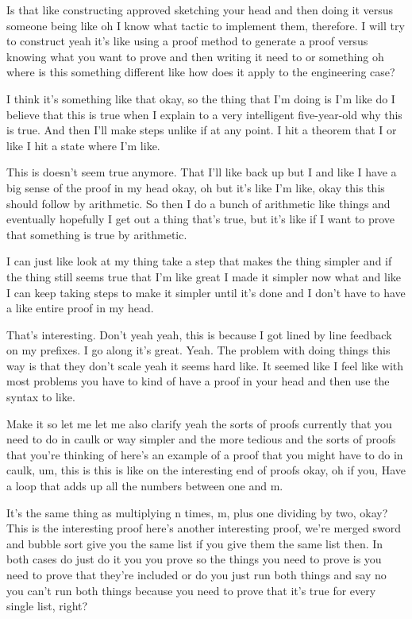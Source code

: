 Is that like constructing approved sketching your head and then doing it versus someone being like oh I know what tactic to implement them, therefore. I will try to construct yeah it's like using a proof method to generate a proof versus knowing what you want to prove and then writing it need to or something oh where is this something different like how does it apply to the engineering case? 

I think it's something like that okay, so the thing that I'm doing is I'm like do I believe that this is true when I explain to a very intelligent five-year-old why this is true. And then I'll make steps unlike if at any point. I hit a theorem that I or like I hit a state where I'm like. 

This is doesn't seem true anymore. That I'll like back up but I and like I have a big sense of the proof in my head okay, oh but it's like I'm like, okay this this should follow by arithmetic. So then I do a bunch of arithmetic like things and eventually hopefully I get out a thing that's true, but it's like if I want to prove that something is true by arithmetic. 

I can just like look at my thing take a step that makes the thing simpler and if the thing still seems true that I'm like great I made it simpler now what and like I can keep taking steps to make it simpler until it's done and I don't have to have a like entire proof in my head. 

That's interesting. Don't yeah yeah, this is because I got lined by line feedback on my prefixes. I go along it's great. Yeah. The problem with doing things this way is that they don't scale yeah it seems hard like. It seemed like I feel like with most problems you have to kind of have a proof in your head and then use the syntax to like. 

Make it so let me let me also clarify yeah the sorts of proofs currently that you need to do in caulk or way simpler and the more tedious and the sorts of proofs that you're thinking of here's an example of a proof that you might have to do in caulk, um, this is this is like on the interesting end of proofs okay, oh if you, Have a loop that adds up all the numbers between one and m. 

It's the same thing as multiplying n times, m, plus one dividing by two, okay? This is the interesting proof here's another interesting proof, we're merged sword and bubble sort give you the same list if you give them the same list then. In both cases do just do it you you prove so the things you need to prove is you need to prove that they're included or do you just run both things and say no you can't run both things because you need to prove that it's true for every single list, right? 

